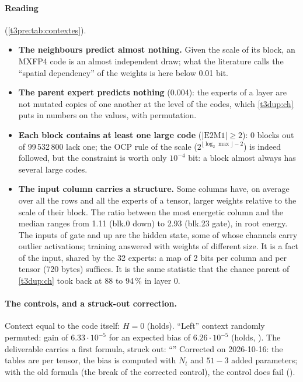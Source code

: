 \paragraph{Reading} (\cref{t3pre:tab:contextes}).
\begin{itemize}
\item \textbf{The neighbours predict almost nothing.} Given the scale of its block, an MXFP4 code is an almost independent draw; what the literature calls the ``spatial dependency'' of the weights is here below 0.01 bit.
\item \textbf{The parent expert predicts nothing} (0.004): the experts of a layer are not mutated copies of one another at the level of the codes, which \cref{t3dup:ch} puts in numbers on the values, with permutation.
\item \textbf{Each block contains at least one large code} ($|\mathrm{E2M1}| \ge 2$): 0 blocks out of 99\,532\,800 lack one; the OCP rule of the scale ($2^{\lfloor\log_2 \max\rfloor - 2}$) is indeed followed, but the constraint is worth only $10^{-4}$ bit: a block almost always has several large codes.
\item \textbf{The input column carries a structure.} Some columns have, on average over all the rows and all the experts of a tensor, larger weights relative to the scale of their block. The ratio between the most energetic column and the median ranges from 1.11 (blk.0 down) to 2.93 (blk.23 gate), in root energy. The inputs of gate and up are the hidden state, some of whose channels carry outlier activations; training answered with weights of different size. It is a fact of the input, shared by the 32 experts: a map of 2 bits per column and per tensor (720 bytes) suffices. It is the same statistic that the chance parent of \cref{t3dup:ch} took back at 88 to 94\,\% in layer 0.
\end{itemize}

\paragraph{The controls, and a struck-out correction.} Context equal to the code itself: $H = 0$ (holds). ``Left'' context randomly permuted: gain of $6.33\cdot10^{-5}$ for an expected bias of $6.26\cdot10^{-5}$ (holds, ). The deliverable carries a first formula, struck out: ``'' Corrected on 2026-10-16: the tables are per tensor, the bias is computed with $N_t$ and $51 - 3$ added parameters; with the old formula (the break of the corrected control), the control does fail ().


